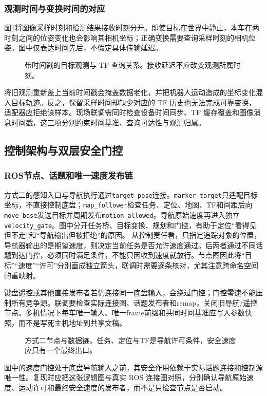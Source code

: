 \subsubsection{观测时间与变换时间的对应}
图\ref{fig:observation-time}将图像采样时刻和检测结果接收时刻分开。即使目标在世界中静止，本车在两时刻之间的位姿变化也会影响其相机坐标；正确变换需要查询采样时刻的相机位姿。图中仅表达时间先后，不假定具体传输延迟。
\begin{figure}[H]\centering
\resizebox{\linewidth}{!}{}
\caption{带时间戳的目标观测与 TF 查询关系。接收延迟不应改变观测所属时刻。}\label{fig:observation-time}
\end{figure}
将旧观测重新盖上当前时间戳会掩盖数据老化，并把机器人运动造成的坐标变化混入目标轨迹。反之，保留采样时间却缺少对应的 TF 历史也无法完成可靠变换，适配器应拒绝该样本。现场联调需同时检查设备时间同步、TF 缓存覆盖和图像消息时间戳，这三项分别约束时间基准、查询可达性与观测归属。

\subsection{控制架构与双层安全门控}
\subsubsection{ROS节点、话题和唯一速度发布链}
方式二的感知入口与导航执行通过\texttt{target\_\allowbreak pose}连接。\texttt{marker\_\allowbreak target}只适配目标坐标，不直接控制底盘；\texttt{map\_\allowbreak follower}检查任务、定位、地图、TF和间距后向\texttt{move\_\allowbreak base}发送目标并周期发布\texttt{motion\_\allowbreak allowed}。导航原始速度再进入独立\texttt{velocity\_\allowbreak gate}。图中分开任务桥、目标变换、规划和门控，有助于定位“看得见但不走”和“导航输出但被拒绝”的原因。
从控制责任看，只指定追踪对象的位置，导航器输出的是期望速度，则决定当前任务是否允许速度通过。后两者通过不同话题到达门控，必须同时满足条件，不能只因收到速度就放行。节点图因此将“目标”“速度”“许可”分别画成独立箭头，联调时需要逐条核对，尤其注意跨命名空间的重映射。

键盘遥控或其他直接发布者若仍连接同一底盘输入，会绕过门控；门控零速不能压制所有竞争源。联调要检查实际连接图、话题发布者和remap，关闭旧导航/遥控节点。多机情况下每车唯一输入、唯一frame前缀和共同时间基准应写入参数快照，而不是写死主机地址到共享文稿。

\begin{figure}[H]\centering\caption{方式二节点与数据链。任务、定位与TF是导航许可条件，安全速度应只有一个最终出口。}\label{fig:f2-nodes}\end{figure}
图中的速度门控处于底盘导航输入之前，其安全作用依赖于实际话题连接和控制源唯一性。复现时应把这张逻辑图与真实 ROS 连接图对照，分别确认导航原始速度、运动许可和最终安全速度的发布者，而不是只检查节点是否启动。


